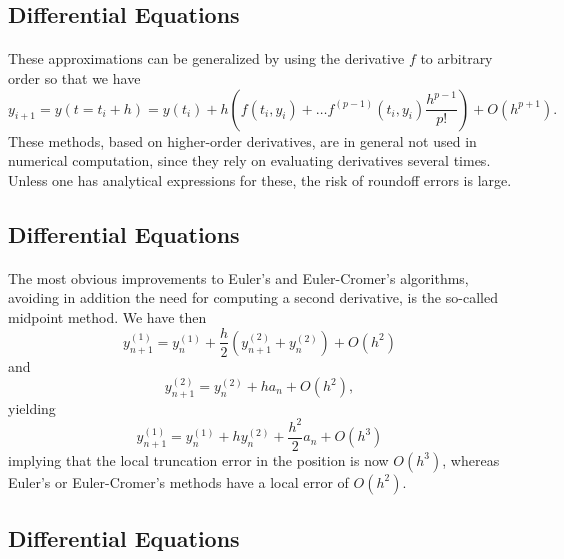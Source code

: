 \documentclass[%
oneside,                 %
final,                   %
10pt]{article}
\begin{document}
\subsection{Differential Equations}

\paragraph{}
These approximations can be generalized by using the derivative $f$ to
arbitrary order so that we have
\begin{equation}
     y_{i+1}=y(t=t_i+h)=y(t_i) + h(f(t_i,y_i)+\dots f^{(p-1)}(t_i,y_i)
     \frac{h^{p-1}}{p!}) + O(h^{p+1}).
\end{equation}
These methods, based on higher-order derivatives, are in general not used
in numerical computation, since they rely on evaluating 
derivatives several times. Unless one has analytical expressions
for these, the risk of roundoff errors is large.



\subsection{Differential Equations}

\paragraph{}
The most obvious improvements to Euler's and Euler-Cromer's algorithms, 
avoiding in addition the need for computing a
second derivative, is the so-called midpoint method. We have then
\begin{equation} 
   y^{(1)}_{n+1}=y^{(1)}_{n}+\frac{h}{2}\left(y^{(2)}_{n+1}+y^{(2)}_{n}\right)+O(h^2)
\end{equation}
and 
\begin{equation}
   y^{(2)}_{n+1}=y^{(2)}_{n}+h a_{n}+O(h^2),
\end{equation}
yielding
\begin{equation} 
   y^{(1)}_{n+1}=y^{(1)}_{n}+hy^{(2)}_{n}+\frac{h^2}{2}a_n+O(h^3)
\end{equation}
implying that the local truncation error in the position is now $O(h^3)$, whereas Euler's or Euler-Cromer's
methods have a local error of  $O(h^2)$.



\subsection{Differential Equations}
\end{document}
